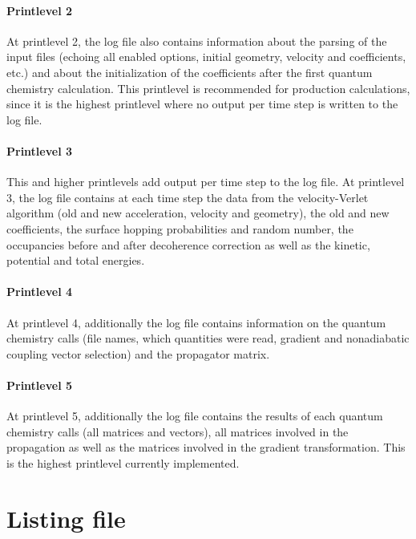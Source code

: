 \documentclass[a4paper,10pt,DIV=15,openany]{scrbook}
\begin{document}
\paragraph{Printlevel 2}

At printlevel 2, the log file also contains information about the parsing of the input files (echoing all enabled options, initial geometry, velocity and coefficients, etc.) and about the initialization of the coefficients after the first quantum chemistry calculation. This printlevel is recommended for production calculations, since it is the highest printlevel where no output per time step is written to the log file.

\paragraph{Printlevel 3}

This and higher printlevels add output per time step to the log file. At printlevel 3, the log file contains at each time step the data from the velocity-Verlet algorithm (old and new acceleration, velocity and geometry), the old and new coefficients, the surface hopping probabilities and random number, the occupancies before and after decoherence correction as well as the kinetic, potential and total energies.

\paragraph{Printlevel 4}

At printlevel 4, additionally the log file contains information on the quantum chemistry calls (file names, which quantities were read, gradient and nonadiabatic coupling vector selection) and the propagator matrix.

\paragraph{Printlevel 5}

At printlevel 5, additionally the log file contains the results of each quantum chemistry calls (all matrices and vectors), all matrices involved in the propagation as well as the matrices involved in the gradient transformation. This is the highest printlevel currently implemented.

\section{Listing file}\label{sec:lisfile}
\end{document}
